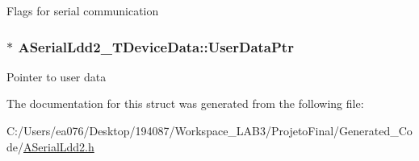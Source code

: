Flags for serial communication \hypertarget{struct_a_serial_ldd2___t_device_data_a5845eb75d51c879a652b884f6c71e8a3}{
\subsubsection[{User\-Data\-Ptr}]{$\ast$ A\-Serial\-Ldd2\-\_\-\-T\-Device\-Data\-::\-User\-Data\-Ptr}}\label{struct_a_serial_ldd2___t_device_data_a5845eb75d51c879a652b884f6c71e8a3}
Pointer to user data 

The documentation for this struct was generated from the following file\-:\begin{DoxyCompactItemize}
\item 
C\-:/\-Users/ea076/\-Desktop/194087/\-Workspace\-\_\-\-L\-A\-B3/\-Projeto\-Final/\-Generated\-\_\-\-Code/\hyperlink{_a_serial_ldd2_8h}{A\-Serial\-Ldd2.\-h}\end{DoxyCompactItemize}
